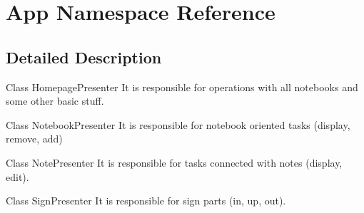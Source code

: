 \hypertarget{namespace_app}{}\section{App Namespace Reference}
\label{namespace_app}


\subsection{Detailed Description}
Class Homepage\+Presenter It is responsible for operations with all notebooks and some other basic stuff.

Class Notebook\+Presenter It is responsible for notebook oriented tasks (display, remove, add)

Class Note\+Presenter It is responsible for tasks connected with notes (display, edit).

Class Sign\+Presenter It is responsible for sign parts (in, up, out).